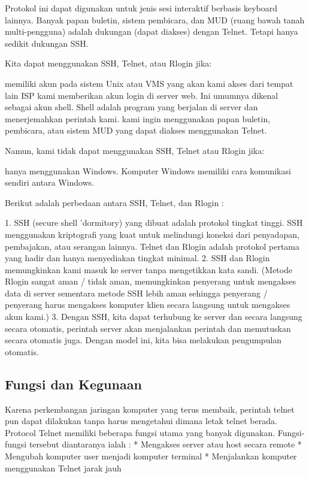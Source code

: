 Protokol ini dapat digunakan untuk jenis sesi interaktif berbasis keyboard lainnya. Banyak papan buletin, sistem pembicara, dan MUD (ruang bawah tanah multi-pengguna) adalah dukungan (dapat diakses) dengan Telnet. Tetapi hanya sedikit dukungan SSH.

Kita dapat menggunakan SSH, Telnet, atau Rlogin jika:

    memiliki akun pada sistem Unix atau VMS yang akan kami akses dari tempat lain
    ISP kami memberikan akun login di server web. Ini umumnya dikenal sebagai akun shell. Shell adalah program yang berjalan di server dan menerjemahkan perintah kami.
    kami ingin menggunakan papan buletin, pembicara, atau sistem MUD yang dapat diakses menggunakan Telnet.

Namun, kami tidak dapat menggunakan SSH, Telnet atau Rlogin jika:

    hanya menggunakan Windows. Komputer Windows memiliki cara komunikasi sendiri antara Windows.

	Berikut adalah perbedaan antara SSH, Telnet, dan Rlogin :

1. SSH (secure shell 'dormitory) yang dibuat adalah protokol tingkat tinggi. SSH menggunakan kriptografi yang kuat untuk melindungi koneksi dari penyadapan, pembajakan, atau serangan lainnya. Telnet dan Rlogin adalah protokol pertama yang hadir dan hanya menyediakan tingkat minimal.
2. SSH dan Rlogin memungkinkan kami masuk ke server tanpa mengetikkan kata sandi. (Metode Rlogin sangat aman / tidak aman, memungkinkan penyerang untuk mengakses data di server sementara metode SSH lebih aman sehingga penyerang / penyerang harus mengakses komputer klien secara langsung untuk mengakses akun kami.)
3. Dengan SSH, kita dapat terhubung ke server dan secara langsung secara otomatis, perintah server akan menjalankan perintah dan memutuskan secara otomatis juga. Dengan model ini, kita bisa melakukan pengumpulan otomatis.


\subsection {Fungsi dan Kegunaan}

Karena perkembangan jaringan komputer yang terus membaik, perintah telnet pun dapat dilakukan tanpa harus mengetahui dimana letak telnet berada. Protocol Telnet memiliki beberapa fungsi utama yang banyak digunakan. Fungsi-fungsi tersebut diantaranya ialah :
* Mengakses server atau host secara remote
* Mengubah komputer user menjadi komputer terminal
* Menjalankan komputer menggunakan Telnet jarak jauh